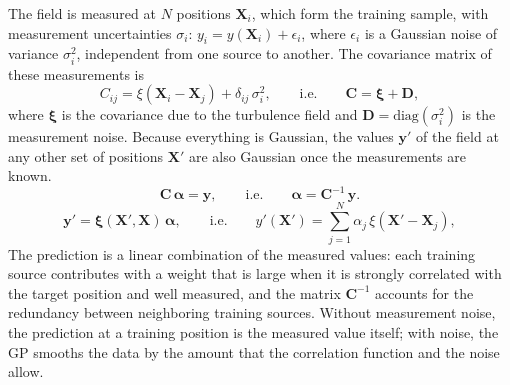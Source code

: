 The field is measured at $N$ positions $\mathbf{X}_i$, which form the training sample, with measurement 
uncertainties $\sigma_i$: $y_i = y(\mathbf{X}_i) + \epsilon_i$, where $\epsilon_i$ is a Gaussian noise of variance $\sigma_i^2$, independent from one 
source to another.
The covariance matrix of these measurements is
\begin{equation}
\label{eq:C}
C_{ij} = \xi(\mathbf{X}_i - \mathbf{X}_j) + \delta_{ij}\,\sigma_i^2 , \qquad \text{i.e.} \qquad \mathbf{C} = \boldsymbol{\xi} + \mathbf{D},
\end{equation}
where $\boldsymbol{\xi}$ is the covariance due to the turbulence field and $\mathbf{D} = \mathrm{diag}(\sigma_i^2)$ is the measurement noise.
Because everything is Gaussian, the values $\mathbf{y}'$ of the field at any other set of positions $\mathbf{X}'$ are also Gaussian once the
measurements are known. 
\begin{equation}
\label{eq:alpha}
\mathbf{C}\, \boldsymbol{\alpha} = \mathbf{y}, \qquad \text{i.e.} \qquad \boldsymbol{\alpha} = \mathbf{C}^{-1}\, \mathbf{y} .
\end{equation}
\begin{equation}
\label{eq:gpmean}
\mathbf{y}' = \boldsymbol{\xi}(\mathbf{X}', \mathbf{X})\, \boldsymbol{\alpha}, \qquad \text{i.e.} \qquad
y'(\mathbf{X}') = \sum_{j=1}^{N} \alpha_j\, \xi(\mathbf{X}' - \mathbf{X}_j),
\end{equation}
The prediction is a linear combination of the measured values: each training source contributes with a weight that is
large when it is strongly correlated with the target position and well measured, and the matrix $\mathbf{C}^{-1}$ accounts for the
redundancy between neighboring training sources.
Without measurement noise, the prediction at a training position is the measured value itself; with noise, the GP smooths the data by 
the amount that the correlation function and the noise allow.

